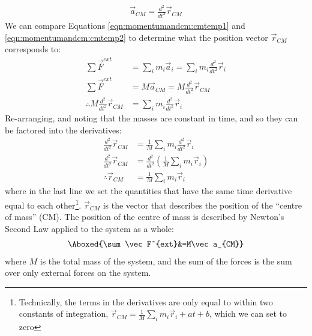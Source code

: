 \begin{align*}
\vec a_{CM} = \frac{d^2 }{dt^2}\vec r_{CM}
\end{align*}
We can compare Equations \ref{eqn:momentumandcm:cmtemp1} and \ref{eqn:momentumandcm:cmtemp2} to determine what the position vector $\vec r_{CM}$ corresponds to:
\begin{align*}
\sum \vec F^{ext}&= \sum_i m_i \vec a_i = \sum_i m_i \frac{d^2 }{dt^2}\vec r_i \\
\sum \vec F^{ext}&=M\vec a_{CM} = M \frac{d^2 }{dt^2}\vec r_{CM}\\
\therefore M \frac{d^2 }{dt^2}\vec r_{CM}&= \sum_i m_i \frac{d^2 }{dt^2}\vec r_i
\end{align*}
Re-arranging, and noting that the masses are constant in time, and so they can be factored into the derivatives:
\begin{align*}
\frac{d^2 }{dt^2}\vec r_{CM} &= \frac{1}{M}\sum_i m_i \frac{d^2 }{dt^2}\vec r_i\\
\frac{d^2 }{dt^2}\vec r_{CM} &= \frac{d^2 }{dt^2}\left(\frac{1}{M}\sum_i m_i\vec r_i \right)\\
\therefore \vec r_{CM} &=\frac{1}{M}\sum_i m_i\vec r_i
\end{align*}
where in the last line we set the quantities that have the same time derivative equal to each other\footnote{Technically, the terms in the derivatives are only equal to within two constants of integration, $\vec r_{CM} =\frac{1}{M}\sum_i m_i\vec r_i + at + b$, which we can set to zero}. $\vec r_{CM}$ is the vector that describes the position of the ``centre of mass'' (CM). The position of the centre of mass is described by Newton's Second Law applied to the system as a whole:
\begin{align}
\Aboxed{\sum \vec F^{ext}&=M\vec a_{CM}}
\end{align}
where $M$ is the total mass of the system, and the sum of the forces is the sum over only external forces on the system.


